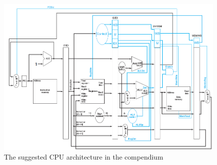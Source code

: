 
\begin{figure}[ht]
    \centering
    \includegraphics[width=\textwidth]{figures/SuggestedArchitecture.png}
    \caption{The suggested CPU architecture in the compendium \cite[p.118]{lab-compendium}} 
    \label{fig:suggestedArchitecture}
\end{figure}

